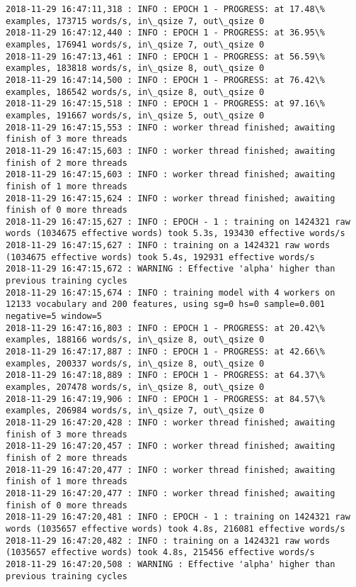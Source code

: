 \documentclass[11pt]{article}
\begin{document}
\begin{Verbatim}[commandchars=\\\{\}]
2018-11-29 16:47:11,318 : INFO : EPOCH 1 - PROGRESS: at 17.48\% examples, 173715 words/s, in\_qsize 7, out\_qsize 0
2018-11-29 16:47:12,440 : INFO : EPOCH 1 - PROGRESS: at 36.95\% examples, 176941 words/s, in\_qsize 7, out\_qsize 0
2018-11-29 16:47:13,461 : INFO : EPOCH 1 - PROGRESS: at 56.59\% examples, 183818 words/s, in\_qsize 8, out\_qsize 0
2018-11-29 16:47:14,500 : INFO : EPOCH 1 - PROGRESS: at 76.42\% examples, 186542 words/s, in\_qsize 8, out\_qsize 0
2018-11-29 16:47:15,518 : INFO : EPOCH 1 - PROGRESS: at 97.16\% examples, 191667 words/s, in\_qsize 5, out\_qsize 0
2018-11-29 16:47:15,553 : INFO : worker thread finished; awaiting finish of 3 more threads
2018-11-29 16:47:15,603 : INFO : worker thread finished; awaiting finish of 2 more threads
2018-11-29 16:47:15,603 : INFO : worker thread finished; awaiting finish of 1 more threads
2018-11-29 16:47:15,624 : INFO : worker thread finished; awaiting finish of 0 more threads
2018-11-29 16:47:15,627 : INFO : EPOCH - 1 : training on 1424321 raw words (1034675 effective words) took 5.3s, 193430 effective words/s
2018-11-29 16:47:15,627 : INFO : training on a 1424321 raw words (1034675 effective words) took 5.4s, 192931 effective words/s
2018-11-29 16:47:15,672 : WARNING : Effective 'alpha' higher than previous training cycles
2018-11-29 16:47:15,674 : INFO : training model with 4 workers on 12133 vocabulary and 200 features, using sg=0 hs=0 sample=0.001 negative=5 window=5
2018-11-29 16:47:16,803 : INFO : EPOCH 1 - PROGRESS: at 20.42\% examples, 188166 words/s, in\_qsize 8, out\_qsize 0
2018-11-29 16:47:17,887 : INFO : EPOCH 1 - PROGRESS: at 42.66\% examples, 200337 words/s, in\_qsize 8, out\_qsize 0
2018-11-29 16:47:18,889 : INFO : EPOCH 1 - PROGRESS: at 64.37\% examples, 207478 words/s, in\_qsize 8, out\_qsize 0
2018-11-29 16:47:19,906 : INFO : EPOCH 1 - PROGRESS: at 84.57\% examples, 206984 words/s, in\_qsize 7, out\_qsize 0
2018-11-29 16:47:20,428 : INFO : worker thread finished; awaiting finish of 3 more threads
2018-11-29 16:47:20,457 : INFO : worker thread finished; awaiting finish of 2 more threads
2018-11-29 16:47:20,477 : INFO : worker thread finished; awaiting finish of 1 more threads
2018-11-29 16:47:20,477 : INFO : worker thread finished; awaiting finish of 0 more threads
2018-11-29 16:47:20,481 : INFO : EPOCH - 1 : training on 1424321 raw words (1035657 effective words) took 4.8s, 216081 effective words/s
2018-11-29 16:47:20,482 : INFO : training on a 1424321 raw words (1035657 effective words) took 4.8s, 215456 effective words/s
2018-11-29 16:47:20,508 : WARNING : Effective 'alpha' higher than previous training cycles

\end{Verbatim}
\end{document}
